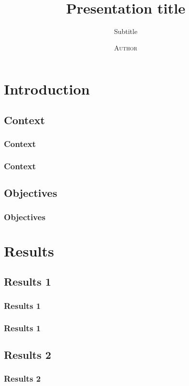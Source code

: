 \documentclass[compress,10pt, handout,sans,red]{beamer}%
\title{Presentation title}
\subtitle{Subtitle}%
\author{\textsc{Author}}%
\institute{Institut}%
\begin{document}
\frame{
	\titlepage %
}

\section{Introduction}
\subsection{Context}
\begin{frame}
	\frametitle{Context}
	
	
\end{frame}


\begin{frame}
	\frametitle{Context}
	
	
\end{frame}


\subsection{Objectives}
\begin{frame}
	\frametitle{Objectives}
	
	
\end{frame}


\section{Results}
\subsection{Results 1}
\begin{frame}
	\frametitle{Results 1}

\end{frame}

\begin{frame}
	\frametitle{Results 1}

\end{frame}


\subsection{Results 2}
\begin{frame}
	\frametitle{Results 2}

\end{frame}
\end{document}

